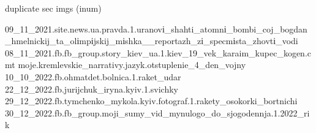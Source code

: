  
 
 
 
 

duplicate sec imgs (inum)

	09_11_2021.site.news.ua.pravda.1.uranovі_shahti_atomnі_bombi_coj_bogdan_hmelnickij_ta_olіmpіjskij_mіshka__reportazh_zі_specmіsta_zhovtі_vodi
	08_11_2021.fb.fb_group.story_kiev_ua.1.kiev_19_vek_karaim_kupec_kogen.cmt
	moje.kremlevskie_narrativy.jazyk.otstuplenie_4_den_vojny
	10_10_2022.fb.ohmatdet.bolnica.1.raket_udar
	22_12_2022.fb.jurijchuk_iryna.kyiv.1.svichky
	29_12_2022.fb.tymchenko_mykola.kyiv.fotograf.1.rakety_osokorki_bortnichi
	30_12_2022.fb.fb_group.moji_sumy_vid_mynulogo_do_sjogodennja.1.2022_rik
